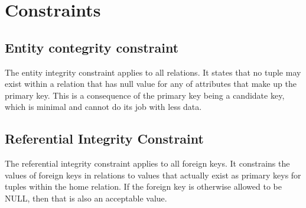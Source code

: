 \documentclass{report}
\begin{document}
\section{Constraints}
\subsection{Entity contegrity constraint}
The entity integrity constraint applies to all relations. It states that no tuple may exist within a relation that has null value for any of attributes that make up the primary key.
\bigbreak \noindent
This is a consequence of the primary key being a candidate key, which is minimal and cannot do its job with less data.
\subsection{Referential Integrity Constraint}
The referential integrity constraint applies to all foreign keys. It constrains the values of foreign keys in relations to values that actually exist as primary keys for tuples within the home relation.
\bigbreak \noindent
If the foreign key is otherwise allowed to be NULL, then that is also an acceptable value.
\end{document}
